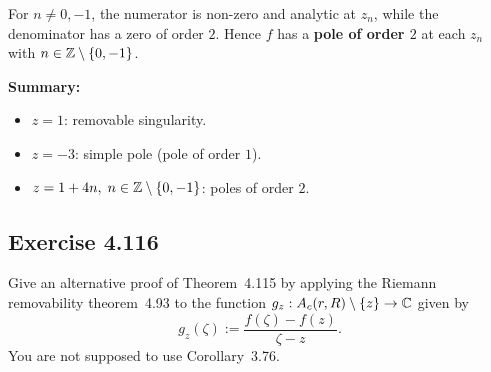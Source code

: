 \documentclass{article}
\begin{document}
\begin{solution}
  For $n \ne 0, -1$, the numerator is non-zero and analytic at $z_n$, while
  the denominator has a zero of order $2$. Hence $f$ has a \textbf{pole of
  order $2$} at each $z_n$ with $n \in \mathbb{Z} \setminus \{0, -1\}$.

  \medskip
  \noindent\textbf{Summary:}
  \begin{itemize}
    \item $z = 1$: removable singularity.
    \item $z = -3$: simple pole (pole of order $1$).
    \item $z = 1 + 4n,\; n \in \mathbb{Z} \setminus \{0, -1\}$: poles of order $2$.
  \end{itemize}
\end{solution}

\subsection{Exercise 4.116}

Give an alternative proof of Theorem~4.115 by applying the Riemann removability
theorem~4.93 to the function $g_z : A_c(r, R) \setminus \{z\} \to \mathbb{C}$ given by
\[
  g_z(\zeta) := \frac{f(\zeta) - f(z)}{\zeta - z}.
\]
You are not supposed to use Corollary~3.76.
\end{document}

